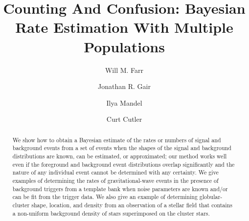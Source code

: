 \documentclass[aps,prd,reprint,nofootinbib]{revtex4-1}
\begin{document}
\title{Counting And Confusion: Bayesian Rate Estimation With Multiple
  Populations}

\author{Will M. Farr} 

\author{Jonathan R. Gair} 

\author{Ilya Mandel} 
 
  
\author{Curt Cutler} 
 



\begin{abstract}
  We show how to obtain a Bayesian estimate of the rates or numbers of
  signal and background events from a set of events when the shapes of
  the signal and background distributions are known, can be estimated,
  or approximated; our method works well even if the foreground and
  background event distributions overlap significantly and the nature
  of any individual event cannot be determined with any certainty.  We
  give examples of determining the rates of gravitational-wave events
  in the presence of background triggers from a template bank when
  noise parameters are known and/or can be fit from the trigger data.
  We also give an example of determining globular-cluster shape,
  location, and density from an observation of a stellar field that
  contains a non-uniform background density of stars superimposed on
  the cluster stars.
\end{abstract}
\end{document}
